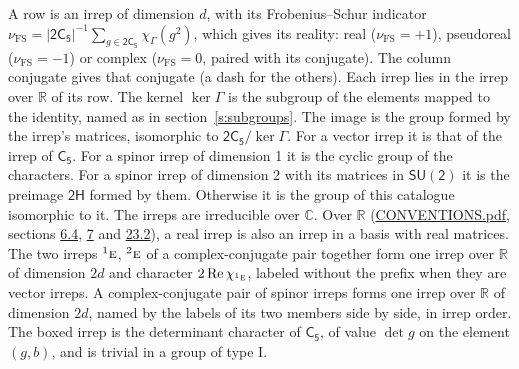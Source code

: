 \documentclass[10pt,a4paper]{article}
\numberwithin{equation}{section}
\newcommand{\grp}[1]{\mathsf{#1}}
\newcommand{\irr}[1]{\text{\normalfont\scshape #1}}
\newcommand{\conjpair}[1]{{}^{#1}}
\newcommand{\irchar}[1]{\chi_{#1}}
\newcommand{\fsind}{\nu_{\mathrm{FS}}}
\begin{document}
\leavevmode\label{n:index.frobenius}\label{n:head.irrep}\label{n:head.reality}A row is an irrep of dimension $d$, with its Frobenius--Schur indicator $\fsind = |\grp{2C_{5}}|^{-1}\allowbreak\sum_{g\in\grp{2C_{5}}}\irchar{\Gamma}(g^2)$, which gives its reality: real ($\fsind = +1$), pseudoreal ($\fsind = -1$) or complex ($\fsind = 0$, paired with its conjugate). \label{n:head.conjugate}The column conjugate gives that conjugate (a dash for the others). \label{n:head.over.real}Each irrep lies in the irrep over $\mathbb{R}$ of its row. \label{n:head.kernel}The kernel $\ker\Gamma$ is the subgroup of the elements mapped to the identity, named as in section~\ref{s:subgroups}. \label{n:head.image}The image is the group formed by the irrep's matrices, isomorphic to $\grp{2C_{5}}/\ker\Gamma$. For a vector irrep it is that of the irrep of \href{../../../rotation/data/pdf/C5.pdf}{$\grp{C_{5}}$}. For a spinor irrep of dimension 1 it is the cyclic group of the characters. For a spinor irrep of dimension 2 with its matrices in $\grp{SU(2)}$ it is the preimage $\grp{2H}$ formed by them. Otherwise it is the group of this catalogue isomorphic to it. The irreps are irreducible over $\mathbb{C}$. Over $\mathbb{R}$ (\href{../../CONVENTIONS.pdf}{CONVENTIONS.pdf}, sections \href{../../../rotation/CONVENTIONS.pdf\#conv.6.4}{6.4}, \href{../../../rotation/CONVENTIONS.pdf\#conv.7}{7} and \href{../../CONVENTIONS.pdf\#conv.23.2}{23.2}), a real irrep is also an irrep in a basis with real matrices. The two irreps $\conjpair{1}\irr{e}$, $\conjpair{2}\irr{e}$ of a complex-conjugate pair together form one irrep over $\mathbb{R}$ of dimension $2d$ and character $2\operatorname{Re}\irchar{\conjpair{1}\irr{e}}$, labeled without the prefix when they are vector irreps. A complex-conjugate pair of spinor irreps forms one irrep over $\mathbb{R}$ of dimension $2d$, named by the labels of its two members side by side, in irrep order. \label{n:mark.determinant}The boxed irrep is the determinant character of \href{../../../rotation/data/pdf/C5.pdf}{$\grp{C_{5}}$}, of value $\det g$ on the element $(g, b)$, and is trivial in a group of type I.
\setlength{\emergencystretch}{2em}\par\setlength{\emergencystretch}{0pt}
\end{document}
